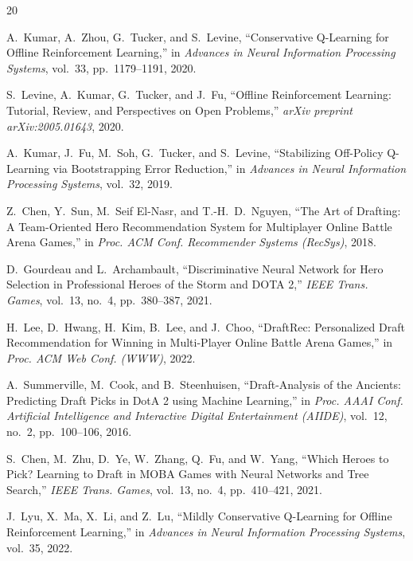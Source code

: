 \documentclass[journal]{IEEEtran}
\begin{document}
\begin{thebibliography}{20}

A.~Kumar, A.~Zhou, G.~Tucker, and S.~Levine, ``Conservative Q-Learning for Offline Reinforcement Learning,'' in \textit{Advances in Neural Information Processing Systems}, vol.~33, pp.~1179--1191, 2020.

S.~Levine, A.~Kumar, G.~Tucker, and J.~Fu, ``Offline Reinforcement Learning: Tutorial, Review, and Perspectives on Open Problems,'' \textit{arXiv preprint arXiv:2005.01643}, 2020.

A.~Kumar, J.~Fu, M.~Soh, G.~Tucker, and S.~Levine, ``Stabilizing Off-Policy Q-Learning via Bootstrapping Error Reduction,'' in \textit{Advances in Neural Information Processing Systems}, vol.~32, 2019.

Z.~Chen, Y.~Sun, M.~Seif El-Nasr, and T.-H.~D.~Nguyen, ``The Art of Drafting: A Team-Oriented Hero Recommendation System for Multiplayer Online Battle Arena Games,'' in \textit{Proc. ACM Conf. Recommender Systems (RecSys)}, 2018.

D.~Gourdeau and L.~Archambault, ``Discriminative Neural Network for Hero Selection in Professional Heroes of the Storm and DOTA 2,'' \textit{IEEE Trans. Games}, vol.~13, no.~4, pp.~380--387, 2021.

H.~Lee, D.~Hwang, H.~Kim, B.~Lee, and J.~Choo, ``DraftRec: Personalized Draft Recommendation for Winning in Multi-Player Online Battle Arena Games,'' in \textit{Proc. ACM Web Conf. (WWW)}, 2022.

A.~Summerville, M.~Cook, and B.~Steenhuisen, ``Draft-Analysis of the Ancients: Predicting Draft Picks in DotA 2 using Machine Learning,'' in \textit{Proc. AAAI Conf. Artificial Intelligence and Interactive Digital Entertainment (AIIDE)}, vol.~12, no.~2, pp.~100--106, 2016.

S.~Chen, M.~Zhu, D.~Ye, W.~Zhang, Q.~Fu, and W.~Yang, ``Which Heroes to Pick? Learning to Draft in MOBA Games with Neural Networks and Tree Search,'' \textit{IEEE Trans. Games}, vol.~13, no.~4, pp.~410--421, 2021.

J.~Lyu, X.~Ma, X.~Li, and Z.~Lu, ``Mildly Conservative Q-Learning for Offline Reinforcement Learning,'' in \textit{Advances in Neural Information Processing Systems}, vol.~35, 2022.


\end{thebibliography}
\end{document}
